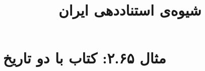 \documentclass[a4paper,10pt]{article}
\begin{document}
\title{شیوه‌ی استناددهی ایران
 }
\author{}
\date{}
\maketitle



\section*{مثال ۲.۶۵: کتاب با دو تاریخ}

\cite{عربی1373}\\
\cite{thompson1964}\\






\end{document}

